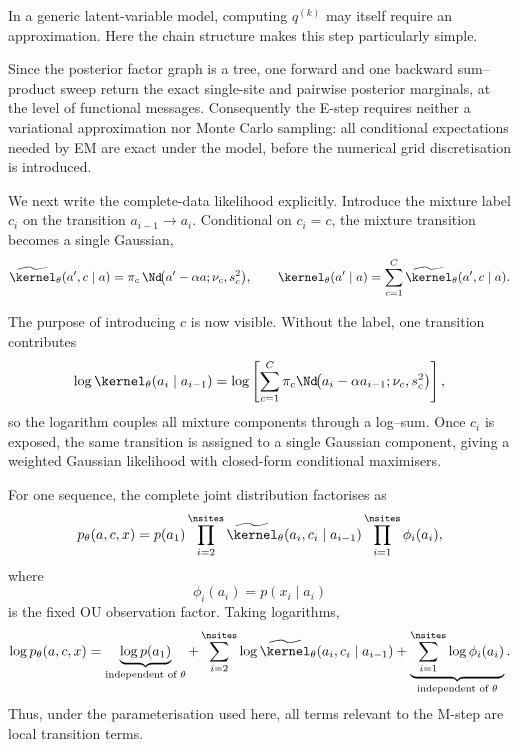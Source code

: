 In a generic latent-variable model, computing $q^{(k)}$ may itself require an
approximation. Here the chain structure makes this step particularly simple.

\begin{proposition}\label{prop:em-estep}
Since the posterior factor graph is a tree, one forward and one backward
sum--product sweep return the exact single-site and pairwise posterior
marginals, at the level of functional messages. Consequently the E-step
requires neither a variational approximation nor Monte Carlo sampling: all
conditional expectations needed by EM are exact under the model, before the
numerical grid discretisation is introduced.
\end{proposition}

We next write the complete-data likelihood explicitly. Introduce the mixture
label $c_i$ on the transition $a_{i-1}\to a_i$. Conditional on $c_i=c$, the
mixture transition becomes a single Gaussian,
\begin{equation}
  \widetilde\kernel_\theta(a',c\mid a)
  =
  \pi_c\,
  \Nd\!\big(
    a'-\alpha a;
    \nu_c,s_c^2
  \big),
  \qquad
  \kernel_\theta(a'\mid a)
  =
  \sum_{c=1}^{C}
  \widetilde\kernel_\theta(a',c\mid a).
  \label{eq:em-complete-kernel}
\end{equation}

The purpose of introducing $c$ is now visible. Without the label, one
transition contributes
\begin{equation}
  \log\kernel_\theta(a_i\mid a_{i-1})
  =
  \log
  \left[
    \sum_{c=1}^{C}
    \pi_c
    \Nd\!\big(
      a_i-\alpha a_{i-1};
      \nu_c,s_c^2
    \big)
  \right],
  \label{eq:em-log-mixture}
\end{equation}
so the logarithm couples all mixture components through a log--sum. Once
$c_i$ is exposed, the same transition is assigned to a single Gaussian
component, giving a weighted Gaussian likelihood with closed-form conditional
maximisers.

For one sequence, the complete joint distribution factorises as
\begin{equation}
  p_\theta(a,c,x)
  =
  p(a_1)
  \prod_{i=2}^{\nsites}
  \widetilde\kernel_\theta(a_i,c_i\mid a_{i-1})
  \prod_{i=1}^{\nsites}
  \phi_i(a_i),
  \label{eq:em-complete-factorisation}
\end{equation}
where
\[
  \phi_i(a_i)=p(x_i\mid a_i)
\]
is the fixed OU observation factor. Taking logarithms,
\begin{equation}
  \log p_\theta(a,c,x)
  =
  \underbrace{\log p(a_1)}_{\text{independent of }\theta}
  +
  \sum_{i=2}^{\nsites}
  \log
  \widetilde\kernel_\theta(a_i,c_i\mid a_{i-1})
  +
  \underbrace{
    \sum_{i=1}^{\nsites}\log\phi_i(a_i)
  }_{\text{independent of }\theta}.
  \label{eq:em-complete-ll}
\end{equation}
Thus, under the parameterisation used here, all terms relevant to the
M-step are local transition terms.


